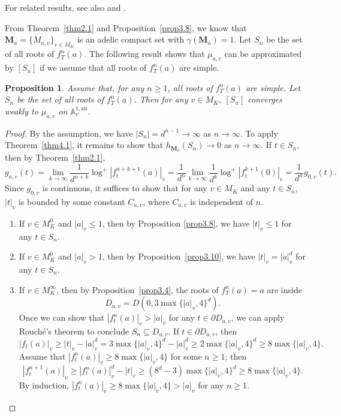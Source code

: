 \documentclass[11pt]{amsart}
\numberwithin{equation}{section}
\theoremstyle{plain}
\newtheorem{prop}[thm]{Proposition}
\theoremstyle{definition}
\theoremstyle{remark}
\newcommand{\A}{\mathbb A}
\newcommand{\an}{\mathrm{an}}
\begin{document}
For  related results, see also \cite{Bi,BR1,CL1,FRL} and \cite[Theorem 10.24]{BR2}.

From Theorem~\ref{thm2.1} and Proposition~\ref{prop3.8}, we know
that $\boldsymbol{M}_{a}=\{M_{a,v}\}_{v\in M_{K}}$ is an adelic compact
set with $\gamma(\boldsymbol{M}_{a})=1$. Let $S_{n}$ be the set
of all roots of $f_{T}^{n}(a)$. The following result shows that $\mu_{a,v}$
can be approximated by $[S_{n}]$ if we assume that all roots of $f_{T}^{n}(a)$
are simple.

\begin{prop}\label{prop4.2}
Assume that, for any $n\geq1$, all roots of $f_{T}^{n}(a)$
are simple. Let $S_{n}$ be the set of all roots of $f_{T}^{n}(a)$.
Then for any $v\in M_{K}$, $[S_{n}]$ converges weakly to $\mu_{a,v}$
on $\A_{v}^{1,\an}$.
\end{prop}

\begin{proof}
By the assumption, we have $|S_{n}|=d^{n-1}\to\infty$ as $n\to\infty$.
To apply Theorem~\ref{thm4.1}, it remains to show that $h_{\boldsymbol{M}_{a}}(S_{n})\to0$
as $n\to\infty$. If $t\in S_{n}$, then by Theorem~\ref{thm2.1},
\[
g_{a,v}(t)=\lim_{k\to\infty}\frac{1}{d^{n+k}}\log^{+}\left|f_{t}^{n+k+1}(a)\right|_{v}=\frac{1}{d^{n}}\lim_{k\to\infty}\frac{1}{d^{k}}\log^{+}\left|f_{t}^{k+1}(0)\right|_{v}=\frac{1}{d^{n}}g_{0,v}(t).
\]
Since $g_{0,v}$ is continuous, it suffices to show that for any $v\in M_{K}$
and any $t\in S_{n}$, $|t|_{v}$ is bounded by some constant $C_{a,v}$,
where $C_{a,v}$ is independent of $n$.
\begin{enumerate}[wide]
\item If $v\in M_{K}^{0}$ and $|a|_{v}\leq1$, then by Proposition
\ref{prop3.8}, we have $|t|_{v}\leq1$ for any $t\in S_{n}$.
\item If $v\in M_{K}^{0}$ and $|a|_{v}>1$, then by Proposition~\ref{prop3.10},
we have $|t|_{v}=|a|_{v}^{d}$ for any $t\in S_{n}$.
\item If $v\in M_{K}^{\infty}$, then by Proposition~\ref{prop3.4},
the roots of $f_{T}^{n}(a)=a$ are inside
\[
D_{a,v}=D(0,3\max\{|a|_{v},4\}^{d}).
\]
Once we can show that $|f_{t}^{n}(a)|_{v}>|a|_{v}$ for any $t\in\partial D_{a,v}$,
we can apply Rouch\'e's theorem to conclude $S_{n}\subseteq D_{a,v}$.
If $t\in\partial D_{a,v}$, then
\[
|f_{t}(a)|_{v}\geq|t|_{v}-|a|_{v}^{d}=3\max\{|a|_{v},4\}^{d}-|a|_{v}^{d}\geq2\max\{|a|_{v},4\}^{d}\geq8\max\{|a|_{v},4\}.
\]
Assume that $|f_{t}^{n}(a)|_{v}\geq8\max\{|a|_{v},4\}$ for some $n\geq1$; 
then
\[
\left|f_{t}^{n+1}(a)\right|_{v}\geq|f_{t}^{n}(a)|_{v}^{d}-|t|_{v}\geq\left(8^{d}-3\right)\max\{|a|_{v},4\}^{d}\geq8\max\{|a|_{v},4\}.
\]
By induction, $|f_{t}^{n}(a)|_{v}\geq8\max\{|a|_{v},4\}>|a|_{v}$
for any $n\geq1$.\hfill\qedhere
\end{enumerate}
\end{proof}
\end{document}
